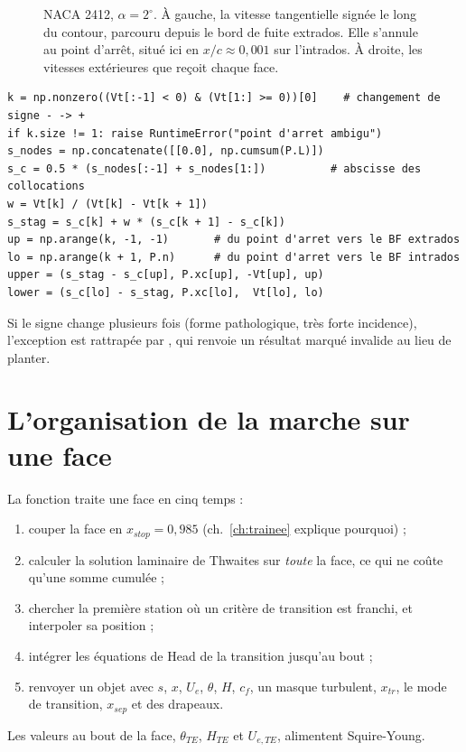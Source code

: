 \begin{figure}[htbp]
\centering

\caption{NACA 2412, $\alpha=2^\circ$. À gauche, la vitesse tangentielle signée le long du contour, parcouru depuis le bord de fuite extrados. Elle s'annule au point d'arrêt, situé ici en $x/c\approx0{,}001$ sur l'intrados. À droite, les vitesses extérieures que reçoit chaque face.}\label{fig:vt}
\end{figure}

\begin{codebox}
\begin{lstlisting}
k = np.nonzero((Vt[:-1] < 0) & (Vt[1:] >= 0))[0]    # changement de signe - -> +
if k.size != 1: raise RuntimeError("point d'arret ambigu")
s_nodes = np.concatenate([[0.0], np.cumsum(P.L)])
s_c = 0.5 * (s_nodes[:-1] + s_nodes[1:])          # abscisse des collocations
w = Vt[k] / (Vt[k] - Vt[k + 1])
s_stag = s_c[k] + w * (s_c[k + 1] - s_c[k])
up = np.arange(k, -1, -1)       # du point d'arret vers le BF extrados
lo = np.arange(k + 1, P.n)      # du point d'arret vers le BF intrados
upper = (s_stag - s_c[up], P.xc[up], -Vt[up], up)
lower = (s_c[lo] - s_stag, P.xc[lo],  Vt[lo], lo)
\end{lstlisting}
Si le signe change plusieurs fois (forme pathologique, très forte incidence), l'exception est rattrapée par , qui renvoie un résultat marqué invalide au lieu de planter.
\end{codebox}

\section{L'organisation de la marche sur une face}
La fonction  traite une face en cinq temps :
\begin{enumerate}
\item couper la face en $x_{stop}=0{,}985$ (ch.~\ref{ch:trainee} explique pourquoi) ;
\item calculer la solution laminaire de Thwaites sur \emph{toute} la face, ce qui ne coûte qu'une somme cumulée ;
\item chercher la première station où un critère de transition est franchi, et interpoler sa position ;
\item intégrer les équations de Head de la transition jusqu'au bout ;
\item renvoyer un objet  avec $s$, $x$, $U_e$, $\theta$, $H$, $c_f$, un masque turbulent, $x_{tr}$, le mode de transition, $x_{sep}$ et des drapeaux.
\end{enumerate}
Les valeurs au bout de la face, $\theta_{TE}$, $H_{TE}$ et $U_{e,TE}$, alimentent Squire-Young.


